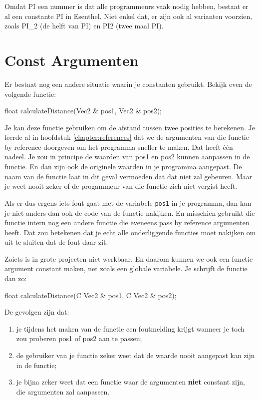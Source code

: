 \begin{note}
Omdat PI een nummer is dat alle programmeurs vaak nodig hebben, bestaat er al een constante PI in Esenthel. Niet enkel dat, er zijn ook al varianten voorzien, zoals PI\_2 (de helft van PI) en PI2 (twee maal PI).
\end{note}

\section{Const Argumenten}
Er bestaat nog een andere situatie waarin je constanten gebruikt. Bekijk even de volgende functie:

\begin{code}
float calculateDistance(Vec2 & pos1, Vec2 & pos2);
\end{code}

Je kan deze functie gebruiken om de afstand tussen twee posities te berekenen. Je leerde al in hoofdstuk \ref{chapter:references} dat we de argumenten van die functie by reference doorgeven om het programma sneller te maken. Dat heeft \'e\'en nadeel. Je zou in principe de waarden van pos1 en pos2 kunnen aanpassen in de functie. En dan zijn ook de originele waarden in je programma aangepast. De naam van de functie laat in dit geval vermoeden dat dat niet zal gebeuren. Maar je weet nooit zeker of de progammeur van die functie zich niet vergist heeft.

Als er dus ergens iets fout gaat met de variabele \verb|pos1| in je programma, dan kan je niet anders dan ook de code van de functie  nakijken. En misschien gebruikt die functie intern nog een andere functie die eveneens pass by reference argumenten heeft. Dat zou betekenen dat je echt alle onderliggende functies moet nakijken om uit te sluiten dat de fout daar zit.

Zoiets is in grote projecten niet werkbaar. En daarom kunnen we ook een functie argument constant maken, net zoals een globale variabele. Je schrijft de functie dan zo:

\begin{code}
float calculateDistance(C Vec2 & pos1, C Vec2 & pos2);
\end{code}

De gevolgen zijn dat:

\begin{enumerate}
	\item je tijdens het maken van de functie een foutmelding krijgt wanneer je toch zou proberen pos1 of pos2 aan te passen;
	\item de gebruiker van je functie zeker weet dat de waarde nooit aangepast kan zijn in de functie;
	\item je bijna zeker weet dat een functie waar de argumenten \textbf{niet} constant zijn, die argumenten zal aanpassen.
\end{enumerate}

